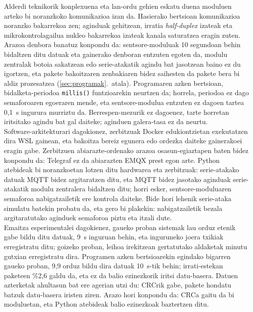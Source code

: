 \documentclass[10pt]{article}
\begin{document}
Alderdi teknikorik konplexuena eta lan-ordu gehien eskatu duena moduluen arteko bi noranzkoko komunikazioa izan da. Hasierako bertsioan komunikazioa noranzko bakarrekoa zen; aginduak gehitzean, irratia \textit{half-duplex} izateak eta mikrokontrolagailua nukleo bakarrekoa izateak kanala saturatzea eragin zuten. Arazoa denbora banatuz konpondu da: sentsore-moduluak 10 segundoan behin bidaltzen ditu datuak eta gainerako denboran entzuten egoten da, modulu zentralak botoia sakatzean edo serie-atakatik agindu bat jasotzean baino ez du igortzen, eta pakete bakoitzaren zenbakiaren bidez saihesten da pakete bera bi aldiz prozesatzea (\ref{sec:programak}.~atala). Programaren azken bertsioan, bidalketa-periodoa \texttt{millis()} funtzioarekin neurtzen da; horrela, periodoa ez dago semaforoaren egoeraren mende, eta sentsore-modulua entzuten ez dagoen tartea 0,1~s ingurura murriztu da. Berrespen-mezurik ez dagoenez, tarte horretan iritsitako agindu bat gal daiteke; aginduen galera-tasa ez da neurtu.\\

Software-arkitekturari dagokionez, zerbitzuak Docker edukiontzietan exekutatzen dira \ac{WSL} gainean, eta bakoitza bereiz egunera edo ordezka daiteke gainerakoei eragin gabe. Zerbitzuen abiarazte-ordenako arazoa osasun-egiaztapen baten bidez konpondu da: Telegraf ez da abiarazten EMQX prest egon arte. Python atebideak bi noranzkoetan lotzen ditu hardwarea eta zerbitzuak: serie-atakako datuak \ac{MQTT} bidez argitaratzen ditu, eta \ac{MQTT} bidez jasotako aginduak serie-atakatik modulu zentralera bidaltzen ditu; horri esker, sentsore-moduluaren semaforoa nabigatzailetik ere kontrola daiteke. Bide hori lehenik serie-ataka simulatu batekin probatu da, eta gero bi plakekin: nabigatzailetik bezala argitaratutako aginduek semaforoa piztu eta itzali dute.\\

Emaitza esperimentalei dagokienez, gaueko proban sistemak lau orduz etenik gabe bildu ditu datuak, 9~s inguruan behin, eta inguruneko joera txikiak erregistratu ditu; goizeko proban, leihoa irekitzean gertatutako aldaketak minutu gutxian erregistratu dira. Programen azken bertsioarekin egindako bigarren gaueko proban, 9,9 orduz bildu dira datuak 10~s-tik behin; irrati-estekan paketeen \%2,6 galdu da, eta ez da balio ezinezkorik iritsi datu-basera. Datuen azterketak ahultasun bat ere agerian utzi du: CRCrik gabe, pakete hondatu batzuk datu-basera iristen ziren. Arazo hori konpondu da: CRCa gaitu da bi moduluetan, eta Python atebideak balio ezinezkoak baztertzen ditu.\\
\end{document}
